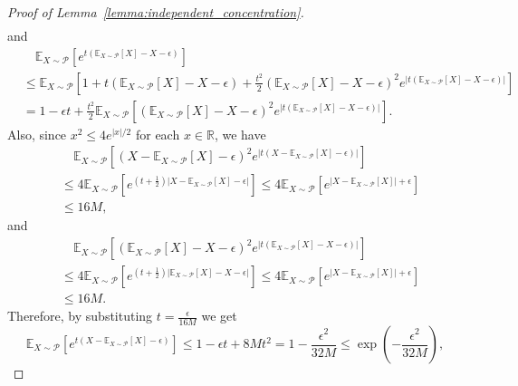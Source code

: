 \begin{proof}[Proof of Lemma~\ref{lemma:independent_concentration}]
\begin{align*}
\end{align*}
and
\begin{align*}
 &\quad \mathbb{E}_{X \sim \mathcal{P}}\left[e^{t\left( \mathbb{E}_{X\sim \mathcal{P}}[X]-X -\epsilon \right)}\right]\\
 &\leq \mathbb{E}_{X \sim \mathcal{P}} \left[ 1 + t\left(\mathbb{E}_{X \sim \mathcal{P}}[X]-X-\epsilon \right) + \frac{t^2}{2} \left(\mathbb{E}_{X \sim \mathcal{P}}[X]-X-\epsilon \right)^2 e^{\left|t\left(\mathbb{E}_{X \sim \mathcal{P}}[X]- X-\epsilon \right) \right|} \right]\\
 &=1 - \epsilon t + \frac{t^2}{2} \mathbb{E}_{X \sim \mathcal{P}} \left [\left(\mathbb{E}_{X \sim \mathcal{P}}[X]-X-\epsilon \right)^2 e^{\left|t \left( \mathbb{E}_{X \sim \mathcal{P}}[X]-X-\epsilon \right) \right|}  \right].
\end{align*}
Also, since $x^2 \leq 4 e^{ |x|/2}$ for each $x \in \mathbb{R}$, we have
\begin{align*}
&\quad \mathbb{E}_{X \sim \mathcal{P}} \left [\left(X - \mathbb{E}_{X \sim \mathcal{P}}[X]-\epsilon \right)^2 e^{\left|t\left(X - \mathbb{E}_{X \sim \mathcal{P}}[X]-\epsilon \right) \right|}  \right] \\
&\leq 4 \mathbb{E}_{X \sim \mathcal{P}} \left[ e^{\left(t+\frac{1}{2}\right) \left|X - \mathbb{E}_{X \sim \mathcal{P}}[X]-\epsilon \right|}  \right]
\leq 4 \mathbb{E}_{X \sim \mathcal{P}} \left[ e^{ \left|X- \mathbb{E}_{X \sim \mathcal{P}}[X] \right| +\epsilon }  \right] \\
&\leq 16M,
\end{align*}
and
\begin{align*}
&\quad \mathbb{E}_{X \sim \mathcal{P}} \left [\left(\mathbb{E}_{X \sim \mathcal{P}}[X]-X-\epsilon \right)^2 e^{\left|t\left(\mathbb{E}_{X \sim \mathcal{P}}[X]-X-\epsilon \right) \right|}  \right] \\
&\leq 4 \mathbb{E}_{X \sim \mathcal{P}} \left[ e^{\left(t+\frac{1}{2}\right) \left|\mathbb{E}_{X \sim \mathcal{P}}[X]-X-\epsilon \right|}  \right]
\leq 4 \mathbb{E}_{X \sim \mathcal{P}} \left[ e^{ \left|X- \mathbb{E}_{X \sim \mathcal{P}}[X] \right| +\epsilon }  \right] \\
&\leq 16M.
\end{align*}
Therefore, by substituting $t = \frac{\epsilon}{16M}$ we get
\begin{equation*}
\mathbb{E}_{X \sim \mathcal{P}}\left[e^{t\left( X - \mathbb{E}_{X\sim \mathcal{P}}[X] -\epsilon \right)}\right]  \leq 1- \epsilon t + 8Mt^2 =  1- \frac{\epsilon^2}{32 M} \leq \exp \left (-\frac{\epsilon^2}{32M} \right),

\end{equation*}
\end{proof}
